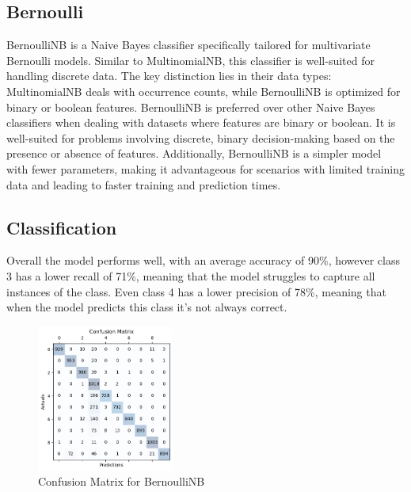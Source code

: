 \documentclass{article}
\begin{document}
\begin{titlepage}
  \section{Bernoulli}
  BernoulliNB is a Naive Bayes classifier specifically tailored for multivariate Bernoulli models. Similar to MultinomialNB, this classifier is well-suited for handling discrete data.
  \newline
  \newline
  The key distinction lies in their data types:
  MultinomialNB deals with occurrence counts, while BernoulliNB is optimized for binary or boolean features.
  BernoulliNB is preferred over other Naive Bayes classifiers when dealing with datasets where features are binary or boolean.
  \newline
  \newline
  It is well-suited for problems involving discrete, binary decision-making based on the presence or absence of features.
  Additionally, BernoulliNB is a simpler model with fewer parameters, making it advantageous for scenarios with limited training data and leading to faster training and prediction times.

  \subsection{Classification}
  Overall the model performs well, with an average accuracy of 90\%, however class 3 has a lower recall of 71\%, meaning that the model struggles to capture all instances of the class.
  \newline
  \newline
  Even class 4 has a lower precision of 78\%, meaning that when the model predicts this class it's not always correct.

  \begin{figure}[htbp]
    \centering
    \includegraphics[width=0.4\textwidth]{bernoulliCM.png}
    \caption{Confusion Matrix for BernoulliNB}
    \label{fig:sample}
  \end{figure}


\end{titlepage}
\end{document}
